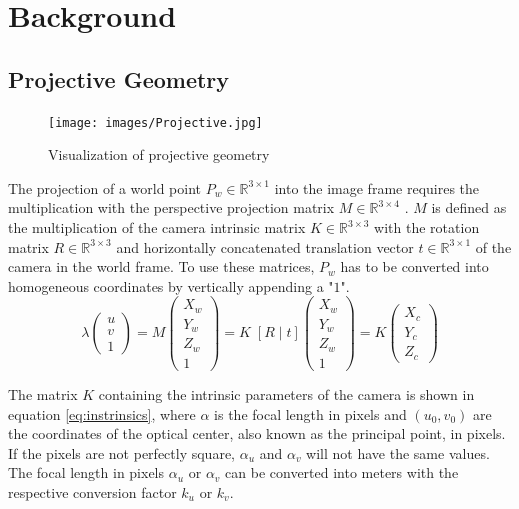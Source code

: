 \chapter{Background}
\section{Projective Geometry}
\begin{figure}[h!]
   \centering
   \texttt{[image: images/Projective.jpg]}
   \caption{Visualization of projective geometry}
   \label{pics:proj}
\end{figure}

The projection of a world point $P_w \in \mathbb{R} ^ {3 \times 1}$ into the image frame requires the multiplication with the perspective projection matrix $M \in \mathbb{R} ^{3 \times 4}$ \citep{dawson1994simple}. $M$ is defined as the multiplication of the camera intrinsic matrix $K  \in \mathbb{R} ^{3\times3}$ with the rotation matrix $R \in \mathbb{R} ^{3 \times 3}$ and  horizontally concatenated translation vector $t \in \mathbb{R} ^{3 \times 1}$ of the camera in the world frame. To use these matrices, $P_w$ has to be converted into homogeneous coordinates by vertically appending a "$1$".
\begin{equation}
 \lambda \begin{pmatrix} u \\ v \\ 1 \end{pmatrix} = M \begin{pmatrix} X_w \\ Y_w\\ Z_w \\ 1 \end{pmatrix} = K \; [R \; | \; t] \begin{pmatrix} X_w \\ Y_w\\ Z_w \\ 1 \end{pmatrix} = K \begin{pmatrix} X_c \\ Y_c\\ Z_c \end{pmatrix}
  \label{eq:proj}
\end{equation}

The matrix $K$ containing the intrinsic parameters of the camera is shown in equation \ref{eq:instrinsics}, where $\alpha$ is the focal length in pixels and $(u_0, v_0)$ are the coordinates of the optical center, also known as the principal point, in pixels. If the pixels are not perfectly square, $\alpha_u$ and $\alpha_v$ will not have the same values. The focal length in pixels $\alpha_u$ or $\alpha_v$ can be converted into meters with the respective conversion factor $k_u$ or $k_v$. 

